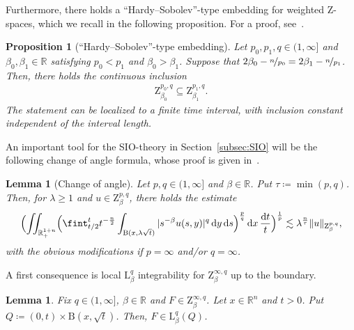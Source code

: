 \documentclass[11pt, leqno]{amsart}
\newtheorem{lemma}[theorem]{Lemma}
\newtheorem{proposition}[theorem]{Proposition}
\theoremstyle{definition}
\newcommand{\R}{\mathbb{R}}
\renewcommand{\L}{\mathrm{L}}
\newcommand{\Z}{\mathrm{Z}}
\renewcommand{\d}{\,\mathrm{d}}
\newcommand{\ddt}{\,\frac{\mathrm{d}t}{t}}
\newcommand{\B}{\mathrm{B}}
\begin{document}
	Furthermore, there holds a \enquote{Hardy--Sobolev}-type embedding for weighted $\Z$-spaces, which we recall in the following proposition. For a proof, see~\cite[Thm.~3.11]{Luca}.

	\begin{proposition}[\enquote{Hardy--Sobolev}-type embedding]
		\label{prop:Z_space_embedding}
		Let $p_0, p_1, q \in (1,\infty]$ and $\beta_0, \beta_1 \in \R$ satisfying $p_0 < p_1$ and $\beta_0 > \beta_1$. Suppose that $2\beta_0 - \nicefrac{n}{p_0} = 2\beta_1 - \nicefrac{n}{p_1}$. Then, there holds the continuous inclusion
		\begin{align}
			\Z^{p_0,q}_{\beta_0} \subseteq \Z^{p_1,q}_{\beta_1}.
		\end{align}
		The statement can be localized to a finite time interval, with inclusion constant independent of the interval length.
	\end{proposition}

	An important tool for the SIO-theory in Section~\ref{subsec:SIO} will be the following change of angle formula, whose proof is given in~\cite[Lem.~3.6]{Luca}.

	\begin{lemma}[Change of angle]
		\label{lem:change_of_angle}
		Let $p,q \in (1,\infty]$ and $\beta \in \R$. Put $\tau \coloneqq \min(p,q)$. Then, for $\lambda \geq 1$ and $u \in \Z^{p,q}_\beta$, there holds the estimate
		\begin{align}
			\Bigl( \iint_{\R^{1+n}_+} \Bigl( \fint_{t/2}^t t^{-\frac{n}{2}} \int_{\B(x, \lambda \sqrt{t})} |s^{-\beta} u(s,y)|^q \d y \d s \Bigr)^\frac{p}{q} \d x \ddt \Bigr)^\frac{1}{p} \lesssim \lambda^\frac{n}{\tau} \| u \|_{\Z^{p,q}_\beta},
		\end{align}
		with the obvious modifications if $p=\infty$ and/or $q=\infty$.
	\end{lemma}

	A first consequence is local $\L^q_{\beta}$ integrability for $\Z^{\infty,q}_\beta$ up to the boundary.

	\begin{lemma}
		\label{lem:Z_local_Lq}
		Fix $q\in (1, \infty]$, $\beta\in \R$ and $F \in \Z^{\infty,q}_{\beta}$. Let $x\in \R^n$ and $t > 0$. Put $Q \coloneqq (0, t) \times \B(x, \sqrt{t})$. Then, $F \in \L^q_{\beta}(Q)$.
	\end{lemma}
\end{document}
